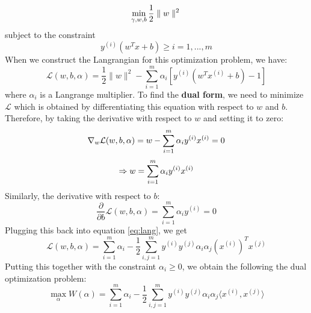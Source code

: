 \documentclass[%
        final,
        notitlepage,
        narroweqnarray,
        inline,
        ]{ieee}
\begin{document}
\begin{equation}
\min_{\gamma, w, b} \frac{1}{2}\parallel w \parallel ^2\\
\end{equation}
subject to the constraint
\begin{equation}
y^{(i)}(w^Tx + b) \geq i = 1, ..., m
\end{equation}
When we construct the Langrangian for this optimization problem, we have:
\begin{equation} \label{eq:lang}
\mathcal {L}(w, b, \alpha) = \frac{1}{2} \parallel w \parallel ^2 - \sum_{i=1}^{m} \alpha_i [y^{(i)}(w^Tx^{(i)} + b) - 1]
\end{equation}
where $\alpha_{i}$ is a Langrange multiplier. To find the \textbf{dual form}, we need to minimize $\mathcal{L}$ which is obtained by differentiating this equation with respect to $w$ and $b$.
Therefore, by taking the derivative with respect to $w$ and setting it to zero:
\begin{equation}
\nabla_{w} \mathcal{L}(w,b,\alpha) = w - \sum_{i=1}^{m} \alpha_{i} y^{(i)} x^{(i)} = 0\\
\end{equation}
\begin{equation} \label{eq:w}
\Rightarrow w = \sum_{i=1}^{m} \alpha_{i} y^{(i)} x^{(i)}\\
\end{equation}
Similarly, the derivative with respect to $b$:
\begin{equation} \label{eq:ay}
\dfrac{\partial}{\partial b} \mathcal{L}(w,b,\alpha) = \sum_{i=1}^{m} \alpha_{i} y^{(i)} = 0
\end{equation}
Plugging this back into equation \ref{eq:lang}, we get
\begin{equation}
\mathcal {L}(w, b, \alpha) = \sum_{i=1}^{m} \alpha_i - \frac{1}{2} \sum_{i,j=1}^{m} y^{(i)}y^{(j)}\alpha_i \alpha_j (x^{(i)})^T x^{(j)}
\end{equation}
Putting this together with the constraint $\alpha_i \geq 0$, we obtain the following the dual optimization problem:
\begin{equation} \label{eq:dual}
\max_{\alpha} W(\alpha) = \sum_{i=1}^{m} \alpha_i - \frac{1}{2} \sum_{i,j=1}^{m} y^{(i)}y^{(j)}\alpha_i \alpha_j \langle x^{(i)}, x^{(j)}\rangle
\end{equation}
\end{document}

